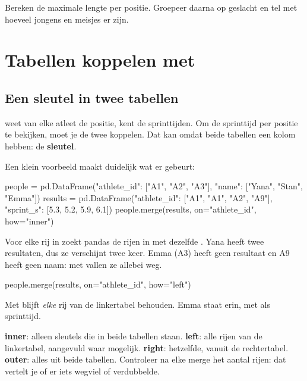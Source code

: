 \documentclass[11pt,a4paper]{article}
\begin{document}
\begin{probeer}
Bereken de maximale lengte per positie. Groepeer daarna op geslacht en
tel met  hoeveel jongens en meisjes er zijn.
\end{probeer}

\section{Tabellen koppelen met }\label{sec:merge}

\subsection{Een sleutel in twee tabellen}

 weet van elke atleet de positie,  kent de
sprinttijden. Om de sprinttijd per positie te bekijken, moet je de twee
koppelen. Dat kan omdat beide tabellen een kolom 
hebben: de \textbf{sleutel}.

Een klein voorbeeld maakt duidelijk wat er gebeurt:

\begin{python}
people = pd.DataFrame({"athlete_id": ["A1", "A2", "A3"],
                       "name": ["Yana", "Stan", "Emma"]})
results = pd.DataFrame({"athlete_id": ["A1", "A1", "A2", "A9"],
                        "sprint_s": [5.3, 5.2, 5.9, 6.1]})
people.merge(results, on="athlete_id", how="inner")
\end{python}

Voor elke rij in  zoekt pandas de rijen in 
met dezelfde . Yana heeft twee resultaten, dus ze
verschijnt twee keer. Emma (A3) heeft geen resultaat en A9 heeft geen
naam: met  vallen ze allebei weg.

\begin{python}
people.merge(results, on="athlete_id", how="left")
\end{python}

Met  blijft \emph{elke} rij van de linkertabel
behouden. Emma staat erin, met  als sprinttijd.

\begin{kernidee}
\textbf{inner}: alleen sleutels die in beide tabellen staan.
\textbf{left}: alle rijen van de linkertabel, aangevuld waar mogelijk.
\textbf{right}: hetzelfde, vanuit de rechtertabel.
\textbf{outer}: alles uit beide tabellen.
Controleer na elke merge het aantal rijen: dat vertelt je of er iets
wegviel of verdubbelde.
\end{kernidee}
\end{document}
